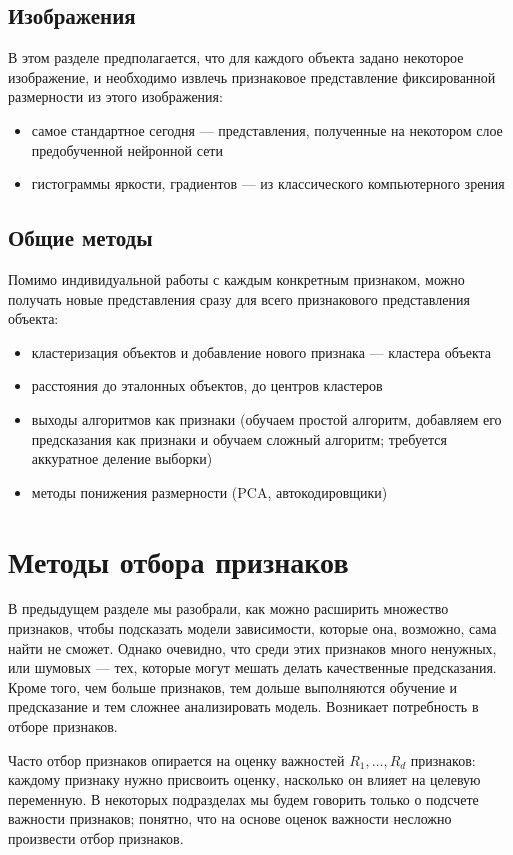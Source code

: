 \documentclass[12pt,a4paper]{article}
\begin{document}
\subsection{Изображения}
	В этом разделе предполагается, что для каждого объекта задано некоторое изображение, и необходимо извлечь признаковое представление фиксированной размерности из этого изображения:
	\begin{itemize}
		\item самое стандартное сегодня --- представления, полученные на некотором слое предобученной нейронной сети
		\item гистограммы яркости, градиентов --- из классического компьютерного зрения
	\end{itemize}
	 
    \subsection{Общие методы}
    Помимо индивидуальной работы с каждым конкретным признаком, можно получать новые представления сразу для всего признакового представления объекта:
    \begin{itemize}
    	\item кластеризация объектов и добавление нового признака --- кластера объекта
    	\item расстояния до эталонных объектов, до центров кластеров
    	\item выходы алгоритмов как признаки (обучаем простой алгоритм, добавляем его предсказания как признаки и обучаем сложный алгоритм; требуется аккуратное деление выборки)
    	\item методы понижения размерности (PCA, автокодировщики)
    \end{itemize}
	
	\section{Методы отбора признаков}
	
	В предыдущем разделе мы разобрали, как можно расширить множество признаков, чтобы подсказать модели зависимости, которые она, возможно, сама найти не сможет. Однако очевидно, что среди этих признаков много ненужных, или шумовых --- тех, которые могут мешать делать качественные предсказания. Кроме того, чем больше признаков, тем дольше выполняются обучение и предсказание и тем сложнее анализировать модель. Возникает потребность в отборе признаков. 
	
	Часто отбор признаков опирается на оценку важностей $R_1, \dots, R_d$ признаков: каждому признаку нужно присвоить оценку, насколько он влияет на целевую переменную. В некоторых подразделах мы будем говорить только о подсчете важности признаков; понятно, что на основе  оценок важности несложно произвести отбор признаков.
	
\end{document}
